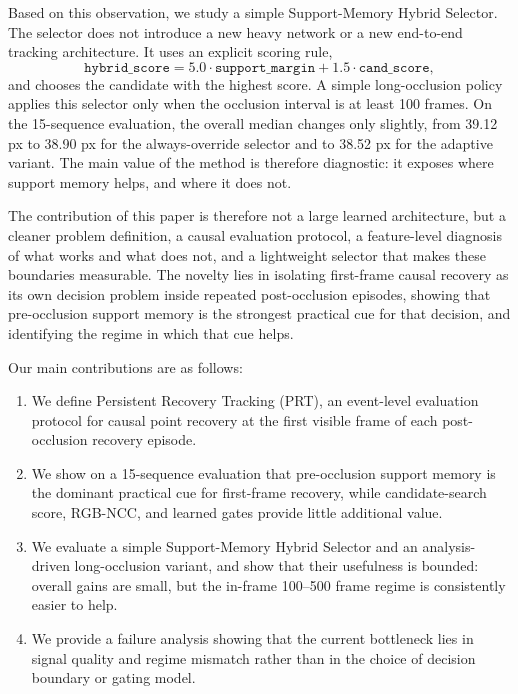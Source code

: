 \documentclass[10pt,journal,compsoc]{IEEEtran}
\newcommand{\method}{Support-Memory Hybrid Selector}
\newcommand{\task}{Persistent Recovery Tracking}
\newcommand{\supportmargin}{\texttt{support\_margin}}
\newcommand{\candscore}{\texttt{cand\_score}}
\begin{document}
Based on this observation, we study a simple \method{}. The selector does not introduce a new heavy network or a new end-to-end tracking architecture. It uses an explicit scoring rule,
\begin{equation}
\texttt{hybrid\_score} = 5.0 \cdot \supportmargin + 1.5 \cdot \candscore,
\end{equation}
and chooses the candidate with the highest score. A simple long-occlusion policy applies this selector only when the occlusion interval is at least 100 frames. On the 15-sequence evaluation, the overall median changes only slightly, from 39.12 px to 38.90 px for the always-override selector and to 38.52 px for the adaptive variant. The main value of the method is therefore diagnostic: it exposes where support memory helps, and where it does not.

The contribution of this paper is therefore not a large learned architecture, but a cleaner problem definition, a causal evaluation protocol, a feature-level diagnosis of what works and what does not, and a lightweight selector that makes these boundaries measurable. The novelty lies in isolating first-frame causal recovery as its own decision problem inside repeated post-occlusion episodes, showing that pre-occlusion support memory is the strongest practical cue for that decision, and identifying the regime in which that cue helps.

Our main contributions are as follows:
\begin{enumerate}[leftmargin=1.5em]
    \item We define \task{} (PRT), an event-level evaluation protocol for causal point recovery at the first visible frame of each post-occlusion recovery episode.
    \item We show on a 15-sequence evaluation that pre-occlusion support memory is the dominant practical cue for first-frame recovery, while candidate-search score, RGB-NCC, and learned gates provide little additional value.
    \item We evaluate a simple \method{} and an analysis-driven long-occlusion variant, and show that their usefulness is bounded: overall gains are small, but the in-frame 100--500 frame regime is consistently easier to help.
    \item We provide a failure analysis showing that the current bottleneck lies in signal quality and regime mismatch rather than in the choice of decision boundary or gating model.
\end{enumerate}
\end{document}
